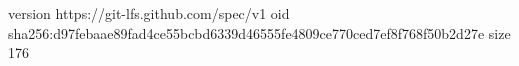 version https://git-lfs.github.com/spec/v1
oid sha256:d97febaae89fad4ce55bcbd6339d46555fe4809ce770ced7ef8f768f50b2d27e
size 176
